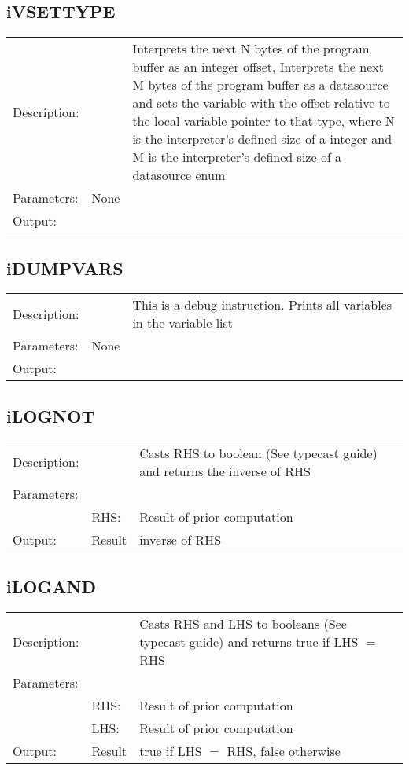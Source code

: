 \documentclass{standalone}
\begin{document}
\subsection{iVSETTYPE}
\begin{tabular}{l l p{10cm}}
Description: & ~    & Interprets the next N bytes of the program buffer as an integer offset, Interprets the next M bytes of the program buffer as a datasource and sets the variable with the offset relative to the local variable pointer to that type, where N is the interpreter's defined size of a integer and M is the interpreter's defined size of a datasource enum\\
Parameters:  & None & ~ \\
Output:      & ~ & ~\\
\end{tabular}

\subsection{iDUMPVARS}
\begin{tabular}{l l p{10cm}}
Description: & ~    & This is a debug instruction. Prints all variables in the variable list\\
Parameters:  & None & ~ \\
Output:      & ~ & ~\\
\end{tabular}

\subsection{iLOGNOT}
\begin{tabular}{l l p{10cm}}
Description: & ~    & Casts RHS to boolean (See typecast guide) and returns the inverse of RHS\\
Parameters:  & ~ & ~ \\
~			 & RHS: & Result of prior computation\\
Output:      & Result & inverse of RHS\\
\end{tabular}

\subsection{iLOGAND}
\begin{tabular}{l l p{10cm}}
Description: & ~    & Casts RHS and LHS to booleans (See typecast guide) and returns true if LHS $=$ RHS\\
Parameters:  & ~ & ~ \\
~			 & RHS: & Result of prior computation\\
~			 & LHS: & Result of prior computation\\
Output:      & Result & true if LHS $=$ RHS, false otherwise\\
\end{tabular}
\end{document}
